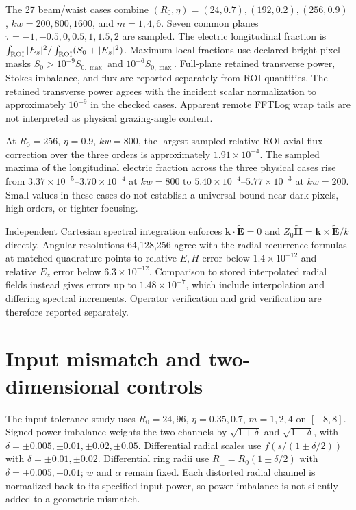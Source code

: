 The 27 beam/waist cases combine $(R_0,\eta)=(24,0.7),(192,0.2),
(256,0.9)$, $kw=200,800,1600$, and $m=1,4,6$.
Seven common planes $\tau=-1,-0.5,0,0.5,1,1.5,2$ are sampled.
The electric longitudinal fraction is
$\int_{\rm ROI}|E_z|^2/\int_{\rm ROI}(S_0+|E_z|^2)$.
Maximum local fractions use declared bright-pixel masks
$S_0>10^{-9}S_{0,\max}$ and $10^{-6}S_{0,\max}$.
Full-plane retained transverse power, Stokes imbalance, and flux are
reported separately from ROI quantities. The retained transverse power
agrees with the incident scalar normalization to approximately $10^{-9}$
in the checked cases. Apparent remote FFTLog wrap tails are not interpreted
as physical grazing-angle content.

At $R_0=256$, $\eta=0.9$, $kw=800$, the largest sampled relative
ROI axial-flux correction over the three orders is approximately
$1.91\times10^{-4}$. The sampled maxima of the longitudinal electric
fraction across the three physical cases rise from
$3.37\times10^{-5}$--$3.70\times10^{-4}$ at $kw=800$ to
$5.40\times10^{-4}$--$5.77\times10^{-3}$ at $kw=200$.
Small values in these cases do not establish a universal bound near
dark pixels, high orders, or tighter focusing.

Independent Cartesian spectral integration enforces
$\bm k\cdot\widetilde{\bm E}=0$ and
$Z_0\widetilde{\bm H}=\bm k\times\widetilde{\bm E}/k$ directly.
Angular resolutions 64,128,256 agree with the radial recurrence formulas
at matched quadrature points to relative $E,H$ error below
$1.4\times10^{-12}$ and relative $E_z$ error below $6.3\times10^{-12}$.
Comparison to stored interpolated radial fields instead gives errors
up to $1.48\times10^{-7}$, which include interpolation and differing
spectral increments. Operator verification and grid verification are
therefore reported separately.

\section{Input mismatch and two-dimensional controls}
\label{sec:si-inputs}
The input-tolerance study uses $R_0=24,96$, $\eta=0.35,0.7$,
$m=1,2,4$ on $[-8,8]$. Signed power imbalance weights the two
channels by $\sqrt{1+\delta}$ and $\sqrt{1-\delta}$, with
$\delta=\pm0.005,\pm0.01,\pm0.02,\pm0.05$.
Differential radial scales use $f(s/(1\pm\delta/2))$ with
$\delta=\pm0.01,\pm0.02$. Differential ring radii use
$R_\pm=R_0(1\pm\delta/2)$ with $\delta=\pm0.005,\pm0.01$;
$w$ and $\alpha$ remain fixed. Each distorted radial channel is
normalized back to its specified input power, so power imbalance is
not silently added to a geometric mismatch.

